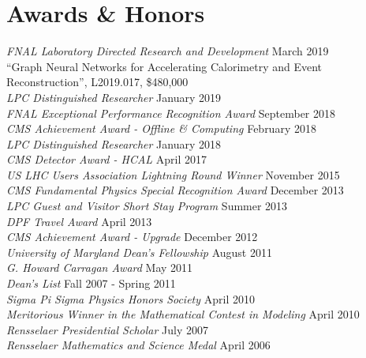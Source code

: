 \section{Awards \& Honors}
{\sl FNAL Laboratory Directed Research and Development} \hfill March 2019\\
``Graph Neural Networks for Accelerating Calorimetry and Event Reconstruction'', L2019.017, \$480,000\\
{\sl LPC Distinguished Researcher} \hfill January 2019\\
{\sl FNAL Exceptional Performance Recognition Award} \hfill September 2018\\
{\sl CMS Achievement Award - Offline \& Computing} \hfill February 2018\\
{\sl LPC Distinguished Researcher} \hfill January 2018\\
{\sl CMS Detector Award - HCAL } \hfill April 2017\\
\ifdefined\longflag
{\sl US LHC Users Association Lightning Round Winner} \hfill November 2015\\
\fi
{\sl CMS Fundamental Physics Special Recognition Award} \hfill December 2013\\
\ifdefined\longestflag
{\sl LPC Guest and Visitor Short Stay Program} \hfill Summer 2013\\
{\sl DPF Travel Award} \hfill April 2013\\
\fi
{\sl CMS Achievement Award - Upgrade} \hfill December 2012\\
\ifdefined\longerflag
{\sl University of Maryland Dean's Fellowship} \hfill August 2011\\
\fi
{\sl G. Howard Carragan Award} \hfill May 2011%
\ifdefined\longflag
\\
\ifdefined\longerflag
{\sl Dean's List} \hfill Fall 2007 - Spring 2011\\
{\sl Sigma Pi Sigma Physics Honors Society} \hfill April 2010\\
\fi
{\sl Meritorious Winner in the Mathematical Contest in Modeling} \hfill April 2010%
\ifdefined\longerflag
\\
{\sl Rensselaer Presidential Scholar} \hfill July 2007\\
{\sl Rensselaer Mathematics and Science Medal} \hfill April 2006%
\fi
\fi